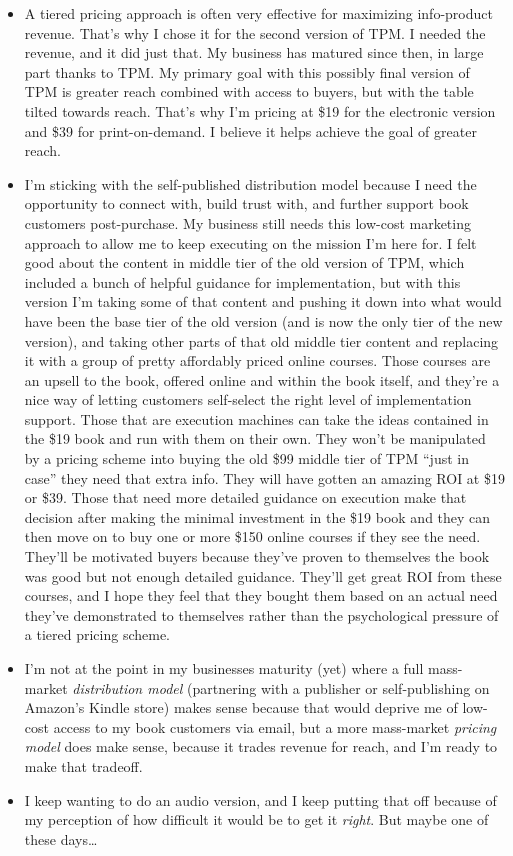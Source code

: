 \begin{itemize}
\begin{itemize}
\item A tiered pricing approach is often very effective for maximizing info-product revenue. That's why I chose it for the second version of TPM. I needed the revenue, and it did just that. My business has matured since then, in large part thanks to TPM. My primary goal with this possibly final version of TPM is greater reach combined with access to buyers, but with the table tilted towards reach. That's why I'm pricing at \$19 for the electronic version and \$39 for print-on-demand. I believe it helps achieve the goal of greater reach.
\item I'm sticking with the self-published distribution model because I need the opportunity to connect with, build trust with, and further support book customers post-purchase. My business still needs this low-cost marketing approach to allow me to keep executing on the mission I'm here for. I felt good about the content in middle tier of the old version of TPM, which included a bunch of helpful guidance for implementation, but with this version I'm taking some of that content and pushing it down into what would have been the base tier of the old version (and is now the only tier of the new version), and taking other parts of that old middle tier content and replacing it with a group of pretty affordably priced online courses. Those courses are an upsell to the book, offered online and within the book itself, and they're a nice way of letting customers self-select the right level of implementation support. Those that are execution machines can take the ideas contained in the \$19 book and run with them on their own. They won't be manipulated by a pricing scheme into buying the old \$99 middle tier of TPM ``just in case'' they need that extra info. They will have gotten an amazing ROI at \$19 or \$39. Those that need more detailed guidance on execution make that decision after making the minimal investment in the \$19 book and they can then move on to buy one or more \$150 online courses if they see the need. They'll be motivated buyers because they've proven to themselves the book was good but not enough detailed guidance. They'll get great ROI from these courses, and I hope they feel that they bought them based on an actual need they've demonstrated to themselves rather than the psychological pressure of a tiered pricing scheme.
\item I'm not at the point in my businesses maturity (yet) where a full mass-market \emph{distribution model} (partnering with a publisher or self-publishing on Amazon's Kindle store) makes sense because that would deprive me of low-cost access to my book customers via email, but a more mass-market \emph{pricing model} does make sense, because it trades revenue for reach, and I'm ready to make that tradeoff.
\item I keep wanting to do an audio version, and I keep putting that off because of my perception of how difficult it would be to get it \emph{right}. But maybe one of these days\ldots{}
\end{itemize}
\end{itemize}

